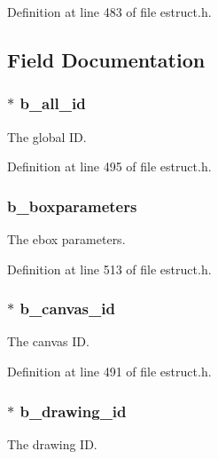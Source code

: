 Definition at line 483 of file estruct.\-h.



\subsection{Field Documentation}
\hypertarget{struct__edspbox_a0f63dcf604135dd4fbfbf43eaed53c1a}{
\subsubsection[{b\-\_\-all\-\_\-id}]{$\ast$ b\-\_\-all\-\_\-id}}\label{struct__edspbox_a0f63dcf604135dd4fbfbf43eaed53c1a}
The global I\-D. 

Definition at line 495 of file estruct.\-h.

\hypertarget{struct__edspbox_a01fa53a36dc717c81755d805a868ad9d}{
\subsubsection[{b\-\_\-boxparameters}]{ b\-\_\-boxparameters}}\label{struct__edspbox_a01fa53a36dc717c81755d805a868ad9d}
The ebox parameters. 

Definition at line 513 of file estruct.\-h.

\hypertarget{struct__edspbox_ac0251c6969a1032f8f50d076e909fb3e}{
\subsubsection[{b\-\_\-canvas\-\_\-id}]{$\ast$ b\-\_\-canvas\-\_\-id}}\label{struct__edspbox_ac0251c6969a1032f8f50d076e909fb3e}
The canvas I\-D. 

Definition at line 491 of file estruct.\-h.

\hypertarget{struct__edspbox_a153f9c9929d722ecb29217f3fb0914c9}{
\subsubsection[{b\-\_\-drawing\-\_\-id}]{$\ast$ b\-\_\-drawing\-\_\-id}}\label{struct__edspbox_a153f9c9929d722ecb29217f3fb0914c9}
The drawing I\-D. 

